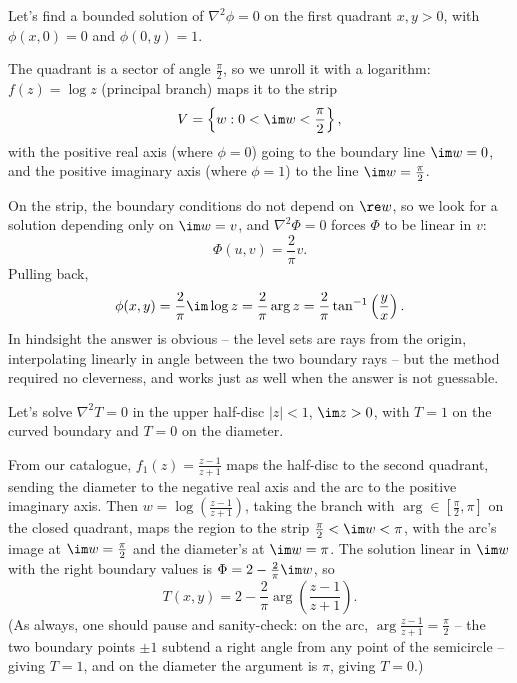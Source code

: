 \begin{example}
	Let's find a bounded solution of $\nabla^2 \phi = 0$ on the first quadrant $x, y > 0$, with $\phi(x, 0) = 0$ and $\phi(0, y) = 1$.

	The quadrant is a sector of angle $\frac{\pi}{2}$, so we unroll it with a logarithm: $f(z) = \log z$ (principal branch) maps it to the strip
	$$
	V = \left\{w : 0 < \im w < \frac{\pi}{2}\right\},
	$$
	with the positive real axis (where $\phi = 0$) going to the boundary line $\im w = 0$, and the positive imaginary axis (where $\phi = 1$) to the line $\im w = \frac{\pi}{2}$.

	On the strip, the boundary conditions do not depend on $\re w$, so we look for a solution depending only on $\im w = v$, and $\nabla^2 \Phi = 0$ forces $\Phi$ to be linear in $v$:
	$$
	\Phi(u, v) = \frac{2}{\pi} v.
	$$
	Pulling back,
	$$
	\phi(x, y) = \frac{2}{\pi} \im \log z = \frac{2}{\pi} \arg z = \frac{2}{\pi} \tan^{-1}\left(\frac{y}{x}\right).
	$$
	In hindsight the answer is obvious -- the level sets are rays from the origin, interpolating linearly in angle between the two boundary rays -- but the method required no cleverness, and works just as well when the answer is not guessable.
\end{example}

\begin{example}
	Let's solve $\nabla^2 T = 0$ in the upper half-disc $|z| < 1$, $\im z > 0$, with $T = 1$ on the curved boundary and $T = 0$ on the diameter.

	From our catalogue, $f_1(z) = \frac{z-1}{z+1}$ maps the half-disc to the second quadrant, sending the diameter to the negative real axis and the arc to the positive imaginary axis. Then $w = \log\left(\frac{z-1}{z+1}\right)$, taking the branch with $\arg \in [\frac{\pi}{2}, \pi]$ on the closed quadrant, maps the region to the strip $\frac{\pi}{2} < \im w < \pi$, with the arc's image at $\im w = \frac{\pi}{2}$ and the diameter's at $\im w = \pi$. The solution linear in $\im w$ with the right boundary values is $\Phi = 2 - \frac{2}{\pi} \im w$, so
	$$
	T(x, y) = 2 - \frac{2}{\pi}\arg\left(\frac{z - 1}{z + 1}\right).
	$$
	(As always, one should pause and sanity-check: on the arc, $\arg\frac{z-1}{z+1} = \frac{\pi}{2}$ -- the two boundary points $\pm 1$ subtend a right angle from any point of the semicircle -- giving $T = 1$, and on the diameter the argument is $\pi$, giving $T = 0$.)
\end{example}

